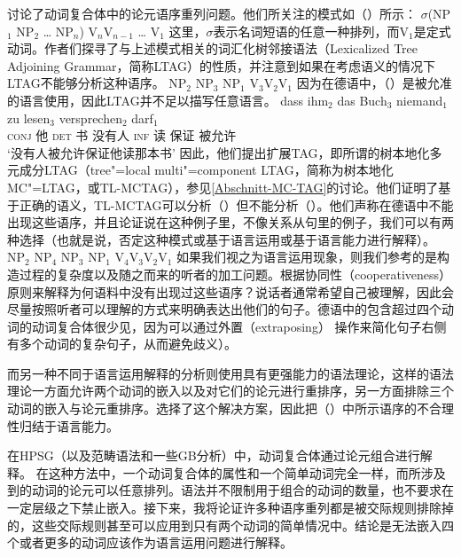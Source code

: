 \citet{JBR2000a}讨论了动词复合体中的论元语序重列问题。他们所关注的模式如（）所示：
\ea
$\sigma$(NP$_1$ NP$_2$ \ldots{} NP$_n$) V$_{n}$V$_{n-1}$ \ldots{} V$_{1}$
\z
这里，$\sigma$表示名词短语的任意一种排列，而V$_{1}$是定式动词。作者们探寻了与上述模式相关的词汇化树邻接语法（Lexicalized Tree Adjoining Grammar，简称LTAG）的性质，并注意到如果在考虑语义的情况下LTAG不能够分析这种语序。
\ea
NP$_2$ NP$_3$ NP$_1$ V$_{3}$V$_{2}$V$_{1}$
\z
因为在德语中，（）是被允准的语言使用，因此LTAG并不足以描写任意语言。
\ea
\gll dass ihm$_2$ das Buch$_3$ niemand$_1$ zu lesen$_3$ versprechen$_2$ darf$_1$\\
     \textsc{conj} 他     \textsc{det} 书 没有人 \textsc{inf} 读 保证 被允许 \\
\glt `没有人被允许保证他读那本书'
\z
因此，他们提出扩展TAG，即所谓的树本地化多元成分LTAG（tree"=local multi"=component LTAG，简称为树本地化MC"=LTAG，或TL-MCTAG），参见\ref{Abschnitt-MC-TAG}的讨论。他们证明了基于正确的语义，TL-MCTAG可以分析（）但不能分析（）。他们声称在德语中不能出现这些语序，并且论证说在这种例子里，不像关系从句里的例子，我们可以有两种选择（也就是说，否定这种模式或基于语言运用或基于语言能力进行解释）。
\ea
\label{ex-mc-ltag-fails}
NP$_2$ NP$_4$ NP$_3$ NP$_1$ V$_{4}$V$_{3}$V$_{2}$V$_{1}$
\z
如果我们视之为语言运用现象，则我们参考的是构造过程的复杂度以及随之而来的听者的加工问题。根据协同性（cooperativeness）
原则来解释为何语料中没有出现过这些语序？说话者通常希望自己被理解，因此会尽量按照听者可以理解的方式来明确表达出他们的句子。德语中的包含超过四个动词的动词复合体很少见，因为可以通过外置（extraposing）
操作来简化句子右侧有多个动词的复杂句子，从而避免歧义\citealp[]{MuellerLehrbuch1}）。

而另一种不同于语言运用解释的分析则使用具有更强能力的语法理论，这样的语法理论一方面允许两个动词的嵌入以及对它们的论元进行重排序，另一方面排除三个动词的嵌入与论元重排序。\citet{JBR2000a}选择了这个解决方案，因此把（）中所示语序的不合理性归结于语言能力。 

在HPSG（以及范畴语法\indexcgc 和一些GB分析\indexgbc）中，动词复合体通过论元组合进行解释\citep{HN89b,HN94a}。 在这种方法中，一个动词复合体的属性和一个简单动词完全一样，而所涉及到的动词的论元可以任意排列。语法并不限制用于组合的动词的数量，也不要求在一定层级之下禁止嵌入。接下来，我将论证许多种语序重列都是被交际规则排除掉的，这些交际规则甚至可以应用到只有两个动词的简单情况中。结论是无法嵌入四个或者更多的动词应该作为语言运用问题进行解释。


